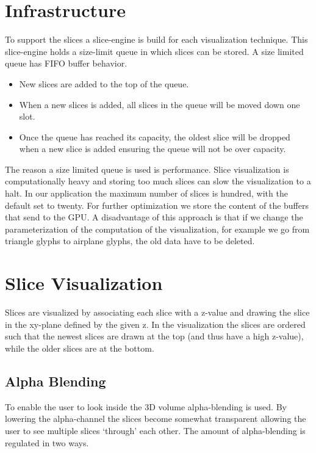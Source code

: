 \section{Infrastructure} %
\label{sec:infrastructure}
To support the slices a slice-engine is build for each visualization technique. This slice-engine holds a size-limit queue in which slices can be stored. A size limited queue has FIFO buffer behavior.
\begin{itemize}
 	\item New slices are added to the top of the queue.
 	\item When a new slices is added, all slices in the queue will be moved down one slot. 
 	\item Once the queue has reached its capacity, the oldest slice will be dropped when a new slice is added ensuring the queue will not be over capacity.
 \end{itemize}
 The reason a size limited queue is used is performance. Slice visualization is computationally heavy and storing too much slices can slow the visualization to a halt. In our application the maximum number of slices is hundred, with the default set to twenty. For further optimization we store the content of the buffers that send to the GPU. A disadvantage of this approach is that if we change the parameterization of the computation of the visualization, for example we go from triangle glyphs to airplane glyphs, the old data have to be deleted. 

\section{Slice Visualization} %
\label{sec:slice_visualization}
Slices are visualized by associating each slice with a z-value and drawing the slice in the xy-plane defined by the given z. In the visualization the slices are ordered such that the newest slices are drawn at the top (and thus have a high z-value), while the older slices are at the bottom. 


\subsection{Alpha Blending} %
\label{sub:alpha_blending}
To enable the user to look inside the 3D volume alpha-blending is used. By lowering the alpha-channel the slices become somewhat transparent allowing the user to see multiple slices `through' each other. The amount of alpha-blending is regulated in two ways. 

